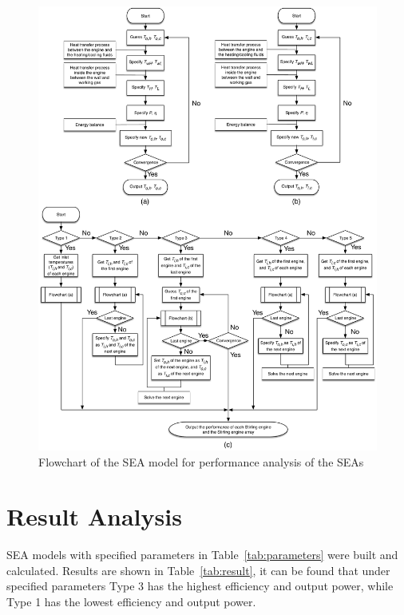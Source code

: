 \documentclass[preprint,5p, twocolumn]{elsarticle}
\begin{document}
\noindent \begin{figure}[htbp]
\begin{center}
	\includegraphics[width = 1.8\columnwidth]{./graphics/FlowChart}
	\caption{Flowchart of the SEA model for performance analysis of the SEAs}
	\label{fig:Flowchart}
\end{center}
\end{figure}

\section{Result Analysis}

SEA models with specified parameters in Table~\ref{tab:parameters} were built and calculated. Results are shown in Table~\ref{tab:result}, it can be found that under specified parameters Type 3 has the highest efficiency and output power, while Type 1 has the lowest efficiency and output power.
\end{document}

